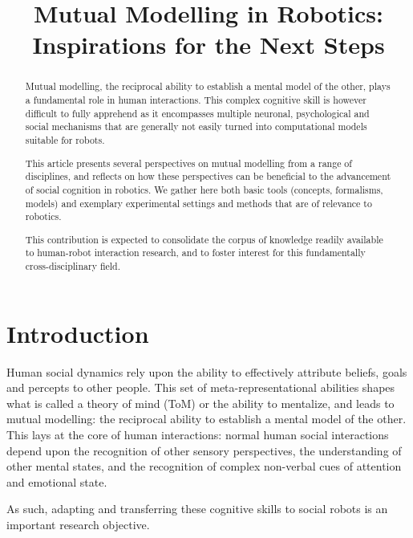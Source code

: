 \documentclass{sig-alternate}
\title{\LARGE \bf
Mutual Modelling in Robotics: \\Inspirations for the Next Steps
}
\begin{document}
\maketitle

\begin{abstract}

Mutual modelling, the reciprocal ability to establish a mental model of the
other, plays a fundamental role in human interactions. This complex cognitive
skill is however difficult to fully apprehend as it encompasses multiple
neuronal, psychological and social mechanisms that are generally not easily
turned into computational models suitable for robots.

This article presents several perspectives on mutual modelling from a range of
disciplines, and reflects on how these perspectives can be beneficial to the
advancement of social cognition in robotics. We gather here both basic tools
(concepts, formalisms, models) and exemplary experimental settings and methods
that are of relevance to robotics.

This contribution is expected to consolidate the corpus of knowledge readily
available to human-robot interaction research, and to foster interest for this
fundamentally cross-disciplinary field.

\end{abstract}


\section{Introduction}

Human social dynamics rely upon the ability to effectively attribute beliefs,
goals and percepts to other people. This set of meta-representational abilities
shapes what is called a theory of mind (ToM) or the ability to mentalize, and leads to
mutual modelling: the reciprocal ability to establish a mental model of the
other. This lays at the core of human interactions: normal human social
interactions depend upon the recognition of other sensory perspectives, the
understanding of other mental states, and the recognition of complex non-verbal
cues of attention and emotional state.

As such, adapting and transferring these cognitive skills to social robots is an important
research objective.
\end{document}
